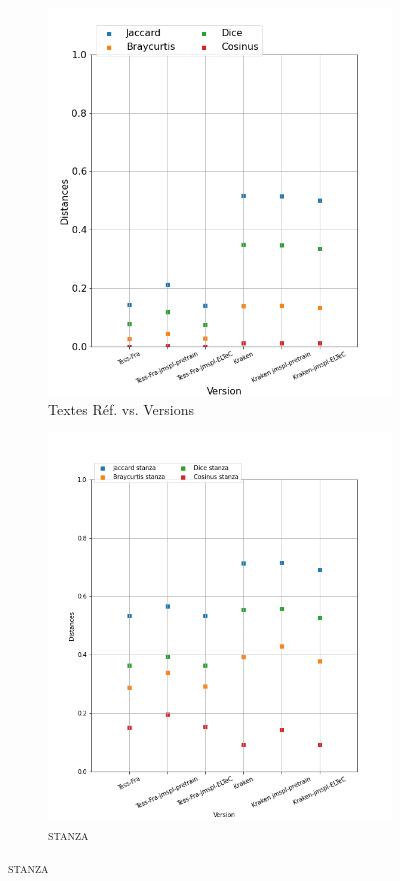 \begin{figure}[H]
\begin{minipage}{6cm}
  \begin{subfigure}{0.89\textwidth}
  \includegraphics[width=.89\textwidth]{IMAGES/ELTeC_DISTANCES_spaCy3.5.1/DAUDET-graph-dist-spaCy3.5.1-txt.png} 
  \caption{Textes Réf. vs. Versions}
  \label{fig:DAUDET-graph-dist-txt}
  \end{subfigure}
  \end{minipage}
  \begin{minipage}{6cm}
  \begin{subfigure}{0.89\textwidth}
  \includegraphics[width=.89\textwidth]{IMAGES/ELTeC_DISTANCES_stanza/DAUDET-graph-dist-stanza-stanza.png}
   \caption{\textsc{stanza}}
 

\end{subfigure}
\end{minipage}
\end{figure}
